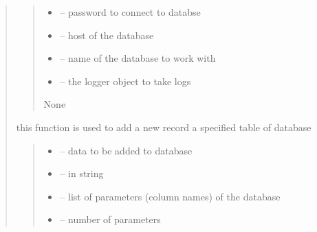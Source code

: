 \documentclass[letterpaper,10pt,english]{sphinxmanual}
\begin{document}
\begin{quote}
\begin{savenotes}
\begin{fulllineitems}
\begin{quote}
\begin{description}
\begin{itemize}
\item {} 
\sphinxAtStartPar
{} – password to connect to databse

\item {} 
\sphinxAtStartPar
{} – host of the database

\item {} 
\sphinxAtStartPar
{} – name of the database to work with

\item {} 
\sphinxAtStartPar
{} – the logger object to take logs

\end{itemize}

\sphinxAtStartPar
None

\end{description}\end{quote}

\begin{savenotes}\begin{fulllineitems}
\label{\detokenize{setting/database:oxin.database.dataBase.add_record}}
\pysigstartsignatures
{}
\pysigstopsignatures
\sphinxAtStartPar
this function is used to add a new record a specified table of database
\begin{quote}\begin{description}
\begin{itemize}
\item {} 
\sphinxAtStartPar
{} – data to be added to database

\item {} 
\sphinxAtStartPar
{} – in string

\item {} 
\sphinxAtStartPar
{} – list of parameters (column names) of the database

\item {} 
\sphinxAtStartPar
{} – number of parameters


\end{itemize}
\end{description}
\end{quote}
\end{fulllineitems}
\end{savenotes}
\end{fulllineitems}
\end{savenotes}
\end{quote}
\end{document}
